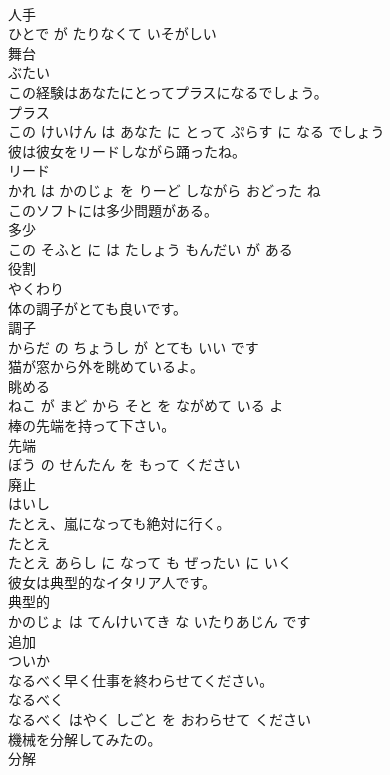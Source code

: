 \documentclass[8pt]{extreport}
\begin{document}
\begin{CJK}{UTF8}{min}
\\	人手 
\\	ひとで が たりなくて いそがしい			
\\	舞台	
\\	ぶたい			
\\	この経験はあなたにとってプラスになるでしょう。	
\\	プラス 
\\	この けいけん は あなた に とって ぷらす に なる でしょう			
\\	彼は彼女をリードしながら踊ったね。	
\\	リード 
\\	かれ は かのじょ を りーど しながら おどった ね			
\\	このソフトには多少問題がある。	
\\	多少 
\\	この そふと に は たしょう もんだい が ある			
\\	役割	
\\	やくわり			
\\	体の調子がとても良いです。	
\\	調子 
\\	からだ の ちょうし が とても いい です			
\\	猫が窓から外を眺めているよ。	
\\	眺める 
\\	ねこ が まど から そと を ながめて いる よ			
\\	棒の先端を持って下さい。	
\\	先端 
\\	ぼう の せんたん を もって ください			
\\	廃止	
\\	はいし			
\\	たとえ、嵐になっても絶対に行く。	
\\	たとえ 
\\	たとえ あらし に なって も ぜったい に いく			
\\	彼女は典型的なイタリア人です。	
\\	典型的 
\\	かのじょ は てんけいてき な いたりあじん です			
\\	追加	
\\	ついか			
\\	なるべく早く仕事を終わらせてください。	
\\	なるべく 
\\	なるべく はやく しごと を おわらせて ください			
\\	機械を分解してみたの。	
\\	分解 

\end{CJK}
\end{document}
